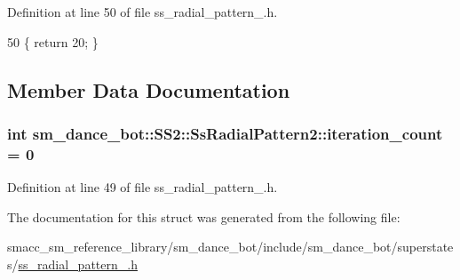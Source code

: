 Definition at line 50 of file ss\+\_\+radial\+\_\+pattern\+\_.\+h.


\begin{DoxyCode}
50 \{ \textcolor{keywordflow}{return} 20; \}
\end{DoxyCode}


\subsection{Member Data Documentation}
\subsubsection[{\texorpdfstring{iteration\+\_\+count}{iteration_count}}]{\setlength{\rightskip}{0pt plus 5cm}int sm\+\_\+dance\+\_\+bot\+::\+S\+S2\+::\+Ss\+Radial\+Pattern2\+::iteration\+\_\+count = 0}\hypertarget{structsm__dance__bot_1_1SS2_1_1SsRadialPattern2_afae1dd33bea98f712ba2938a35c0ddc1}{}\label{structsm__dance__bot_1_1SS2_1_1SsRadialPattern2_afae1dd33bea98f712ba2938a35c0ddc1}


Definition at line 49 of file ss\+\_\+radial\+\_\+pattern\+\_.\+h.



The documentation for this struct was generated from the following file\+:\begin{DoxyCompactItemize}
\item 
smacc\+\_\+sm\+\_\+reference\+\_\+library/sm\+\_\+dance\+\_\+bot/include/sm\+\_\+dance\+\_\+bot/superstates/\hyperlink{ss__radial__pattern__2_8h}{ss\+\_\+radial\+\_\+pattern\+\_.\+h}\end{DoxyCompactItemize}
